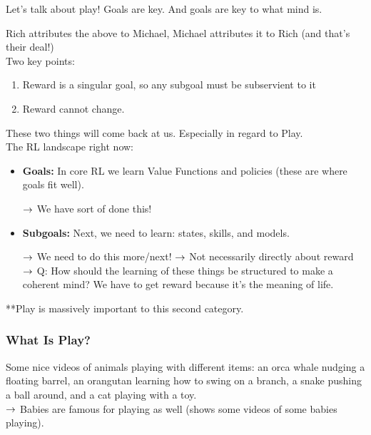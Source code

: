 Let's talk about play! Goals are key. And goals are key to what mind is. \\


Rich attributes the above to Michael, Michael attributes it to Rich (and that's their deal!) \\

Two key points:
\begin{enumerate}
    \item Reward is a singular goal, so any subgoal must be subservient to it
    \item Reward cannot change.
\end{enumerate}

These two things will come back at us. Especially in regard to Play. \\

The RL landscape right now:
\begin{itemize}
    \item {\bf Goals:} In core RL we learn Value Functions and policies (these are where goals fit well).
    
    $\rightarrow$ We have sort of done this!
    
    \item {\bf Subgoals:} Next, we need to learn: states, skills, and models.
    
    $\rightarrow$ We need to do this more/next!
    $\rightarrow$ Not necessarily directly about reward
    $\rightarrow$ Q: How should the learning of these things be structured to make a coherent mind? We have to get reward because it's the meaning of life.
\end{itemize}

**Play is massively important to this second category.


\subsubsection{What Is Play?}

Some nice videos of animals playing with different items: an orca whale nudging a floating barrel, an orangutan learning how to swing on a branch, a snake pushing a ball around, and a cat playing with a toy. \\

$\rightarrow$ Babies are famous for playing as well (shows some videos of some babies playing). \\

